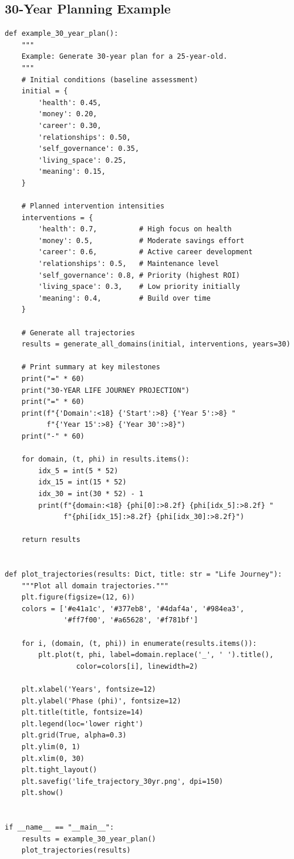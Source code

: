 \subsection{30-Year Planning Example}

\begin{verbatim}
def example_30_year_plan():
    """
    Example: Generate 30-year plan for a 25-year-old.
    """
    # Initial conditions (baseline assessment)
    initial = {
        'health': 0.45,
        'money': 0.20,
        'career': 0.30,
        'relationships': 0.50,
        'self_governance': 0.35,
        'living_space': 0.25,
        'meaning': 0.15,
    }

    # Planned intervention intensities
    interventions = {
        'health': 0.7,          # High focus on health
        'money': 0.5,           # Moderate savings effort
        'career': 0.6,          # Active career development
        'relationships': 0.5,   # Maintenance level
        'self_governance': 0.8, # Priority (highest ROI)
        'living_space': 0.3,    # Low priority initially
        'meaning': 0.4,         # Build over time
    }

    # Generate all trajectories
    results = generate_all_domains(initial, interventions, years=30)

    # Print summary at key milestones
    print("=" * 60)
    print("30-YEAR LIFE JOURNEY PROJECTION")
    print("=" * 60)
    print(f"{'Domain':<18} {'Start':>8} {'Year 5':>8} "
          f"{'Year 15':>8} {'Year 30':>8}")
    print("-" * 60)

    for domain, (t, phi) in results.items():
        idx_5 = int(5 * 52)
        idx_15 = int(15 * 52)
        idx_30 = int(30 * 52) - 1
        print(f"{domain:<18} {phi[0]:>8.2f} {phi[idx_5]:>8.2f} "
              f"{phi[idx_15]:>8.2f} {phi[idx_30]:>8.2f}")

    return results


def plot_trajectories(results: Dict, title: str = "Life Journey"):
    """Plot all domain trajectories."""
    plt.figure(figsize=(12, 6))
    colors = ['#e41a1c', '#377eb8', '#4daf4a', '#984ea3',
              '#ff7f00', '#a65628', '#f781bf']

    for i, (domain, (t, phi)) in enumerate(results.items()):
        plt.plot(t, phi, label=domain.replace('_', ' ').title(),
                 color=colors[i], linewidth=2)

    plt.xlabel('Years', fontsize=12)
    plt.ylabel('Phase (phi)', fontsize=12)
    plt.title(title, fontsize=14)
    plt.legend(loc='lower right')
    plt.grid(True, alpha=0.3)
    plt.ylim(0, 1)
    plt.xlim(0, 30)
    plt.tight_layout()
    plt.savefig('life_trajectory_30yr.png', dpi=150)
    plt.show()


if __name__ == "__main__":
    results = example_30_year_plan()
    plot_trajectories(results)
\end{verbatim}

